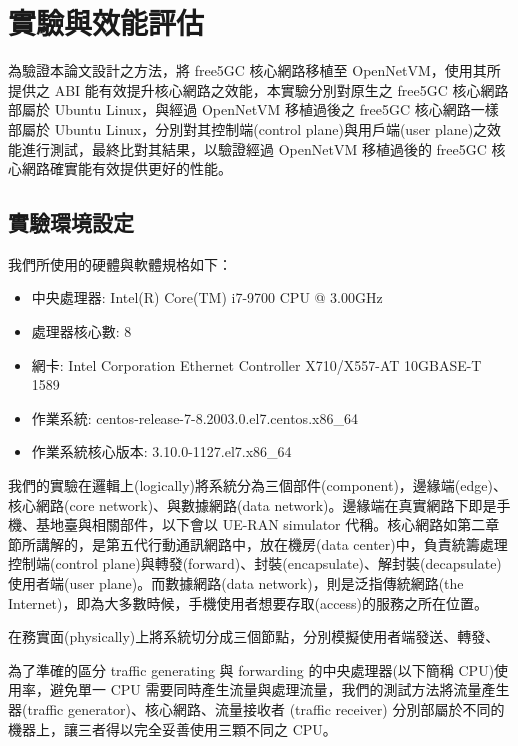 \chapter{實驗與效能評估}
\label{chapter:evaluation}

為驗證本論文設計之方法，將 free5GC 核心網路移植至 OpenNetVM，使用其所提供之 ABI 能有效提升核心網路之效能，本實驗分別對原生之 free5GC 核心網路部屬於 Ubuntu Linux，與經過 OpenNetVM 移植過後之 free5GC 核心網路一樣部屬於 Ubuntu Linux，分別對其控制端(control plane)與用戶端(user plane)之效能進行測試，最終比對其結果，以驗證經過 OpenNetVM 移植過後的 free5GC 核心網路確實能有效提供更好的性能。

\section{實驗環境設定}
\label{sec:evaluation_env}

我們所使用的硬體與軟體規格如下：
\begin{itemize}
\item 中央處理器: Intel(R) Core(TM) i7-9700 CPU @ 3.00GHz
\item 處理器核心數: 8
\item 網卡: Intel Corporation Ethernet Controller X710/X557-AT 10GBASE-T 1589
\item 作業系統: centos-release-7-8.2003.0.el7.centos.x86\_64
\item 作業系統核心版本: 3.10.0-1127.el7.x86\_64
\end{itemize}

我們的實驗在邏輯上(logically)將系統分為三個部件(component)，邊緣端(edge)、核心網路(core network)、與數據網路(data network)。邊緣端在真實網路下即是手機、基地臺與相關部件，以下會以 UE-RAN simulator 代稱。核心網路如第二章節所講解的，是第五代行動通訊網路中，放在機房(data center)中，負責統籌處理控制端(control plane)與轉發(forward)、封裝(encapsulate)、解封裝(decapsulate)使用者端(user plane)。而數據網路(data network)，則是泛指傳統網路(the Internet)，即為大多數時候，手機使用者想要存取(access)的服務之所在位置。

在務實面(physically)上將系統切分成三個節點，分別模擬使用者端發送、轉發、

為了準確的區分 traffic generating 與 forwarding 的中央處理器(以下簡稱 CPU)使用率，避免單一 CPU 需要同時產生流量與處理流量，我們的測試方法將流量產生器(traffic generator)、核心網路、流量接收者 (traffic receiver) 分別部屬於不同的機器上，讓三者得以完全妥善使用三顆不同之 CPU。

